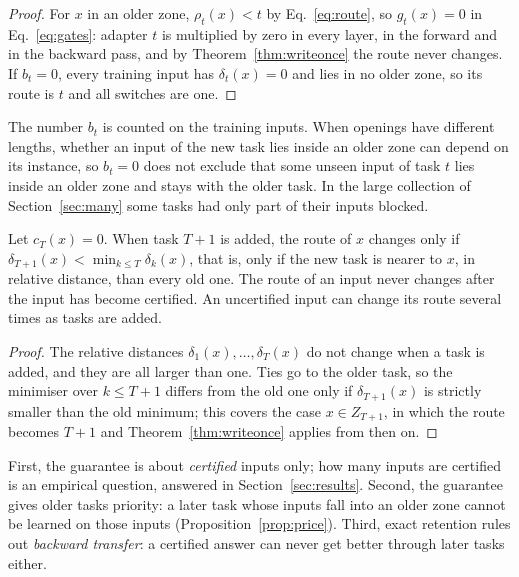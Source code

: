 \begin{proof}
For $x$ in an older zone, $\rho_t(x) < t$ by Eq.~\eqref{eq:route}, so $g_t(x) = 0$ in
Eq.~\eqref{eq:gates}: adapter $t$ is multiplied by zero in every layer, in the forward and in the
backward pass, and by Theorem~\ref{thm:writeonce} the route never changes. If $b_t = 0$, every
training input has $\delta_t(x) = 0$ and lies in no older zone, so its route is $t$ and all switches
are one.
\end{proof}

The number $b_t$ is counted on the training inputs. When openings have different lengths, whether
an input of the new task lies inside an older zone can depend on its instance, so $b_t = 0$ does not
exclude that some unseen input of task $t$ lies inside an older zone and stays with the older task.
In the large collection of Section~\ref{sec:many} some tasks had only part of their inputs blocked.

\begin{proposition}
\label{prop:uncertified}
Let $c_T(x) = 0$. When task $T+1$ is added, the route of $x$ changes only if
$\delta_{T+1}(x) < \min_{k \le T} \delta_k(x)$, that is, only if the new task is nearer to $x$, in
relative distance, than every old one. The route of an input never changes after the input has
become certified. An uncertified input can change its route several times as tasks are added.
\end{proposition}

\begin{proof}
The relative distances $\delta_1(x), \dots, \delta_T(x)$ do not change when a task is added, and
they are all larger than one. Ties go to the older task, so the minimiser over $k \le T+1$ differs
from the old one only if $\delta_{T+1}(x)$ is strictly smaller than the old minimum; this covers
the case $x \in Z_{T+1}$, in which the route becomes $T+1$ and Theorem~\ref{thm:writeonce} applies
from then on.
\end{proof}

\begin{remark}
First, the guarantee is about \emph{certified} inputs only; how many inputs are certified is an
empirical question, answered in Section~\ref{sec:results}. Second, the guarantee gives older tasks
priority: a later task whose inputs fall into an older zone cannot be learned on those inputs
(Proposition~\ref{prop:price}). Third, exact retention rules out \emph{backward transfer}: a
certified answer can never get better through later tasks either.
\end{remark}

